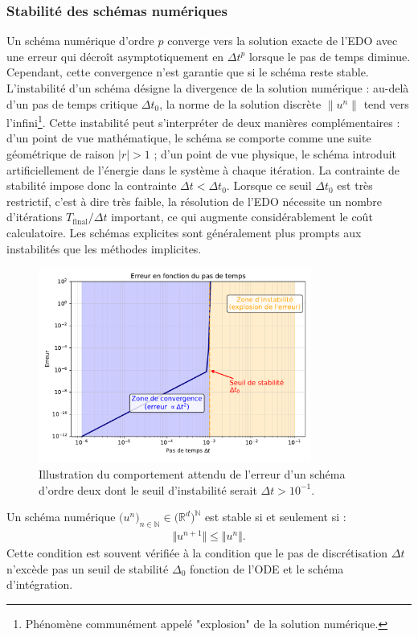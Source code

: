 \subsubsection{Stabilité des schémas numériques}\label{par:stabilite_edo}
Un schéma numérique d'ordre $p$ converge vers la solution exacte de l'EDO avec une erreur qui décroît asymptotiquement en $\Delta t^p$ lorsque le pas de temps diminue.
Cependant, cette convergence n'est garantie que si le schéma reste stable.
L'instabilité d'un schéma désigne la divergence de la solution numérique : au-delà d'un pas de temps critique $\Delta t_0$, la norme de la solution discrète $\|u^n\|$ tend vers l'infini\footnote{Phénomène communément appelé "explosion" de la solution numérique.}.
Cette instabilité peut s'interpréter de deux manières complémentaires : d'un point de vue mathématique, le schéma se comporte comme une suite géométrique de raison $|r| > 1$ ; 
d'un point de vue physique, le schéma introduit artificiellement de l'énergie dans le système à chaque itération.
La contrainte de stabilité impose donc la contrainte $\Delta t < \Delta t_0$. 
Lorsque ce seuil $\Delta t_0$ est très restrictif, c'est à dire très faible, la résolution de l'EDO nécessite un nombre d'itérations $T_{\text{final}}/\Delta t$ important,
ce qui augmente considérablement le coût calculatoire. 
Les schémas explicites sont généralement plus prompts aux instabilités que les méthodes implicites.
\begin{figure}[htbp]
    \centering
    \includegraphics[width=0.8\textwidth]{media/3_/2_/exemple_satabilite.pdf}
    \caption{Illustration du comportement attendu de l'erreur d'un schéma d'ordre deux dont le seuil d'instabilité serait $\Delta t > 10^{-1}$.}
    \label{fig:stabilite_schema}
\end{figure}
\begin{definition}
    Un schéma numérique $\bigl( u^n \bigr)_{n \in \mathbb{N}} \in\bigl(\mathbb{R}^d \bigr)^{\mathbb{N}}$ est stable si et seulement si :
    \begin{align}
        \Vert u^{n+1} \Vert \leq \Vert u^n \Vert.
    \end{align}
    Cette condition est souvent vérifiée à la condition que le pas de discrétisation $\Delta t$ n'excède pas un seuil de stabilité $\Delta_0$ fonction de l'ODE et le schéma d'intégration.
\end{definition}
